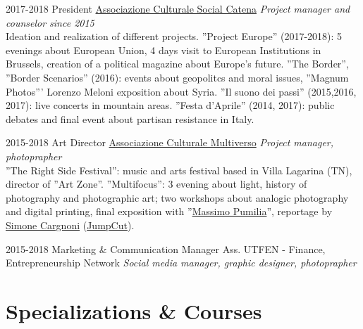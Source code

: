 \documentclass[]{friggeri-cv}
\begin{document}
\begin{entrylist}

\entry
    {2017-2018}
    {President}
    {\href{https://www.facebook.com/SocialCatena/}{Associazione Culturale Social Catena}}
    {\emph{Project manager and counselor since 2015}\\
    Ideation and realization of different projects. ''Project Europe'' (2017-2018): 5 evenings about European Union, 4 days visit to European Institutions in Brussels, creation of a political magazine about Europe's future. ''The Border'', ''Border Scenarios'' (2016): events about geopolitcs and moral issues, ''Magnum Photos''' Lorenzo Meloni exposition about Syria. ''Il suono dei passi'' (2015,2016, 2017): live concerts in mountain areas. ''Festa d’Aprile'' (2014, 2017): public debates and final event about partisan resistance in Italy.
    }

\entry
    {2015-2018}
    {Art Director}
    {\href{https://www.facebook.com/Asso.Multiverso/}{Associazione Culturale Multiverso}}
    {\emph{Project manager, photoprapher}\\
    ''The Right Side Festival'': music and arts festival based in Villa Lagarina (TN), director of ''Art Zone''. ''Multifocus'': 3 evening about light, history of photography and photographic art; two workshops about analogic photography and digital printing, final exposition with ''\href{http://simonecargnoni.com/massimopumilia/}{Massimo Pumilia}'', reportage by \href{http://simonecargnoni.com}{Simone Cargnoni} (\href{http://www.jumpcut.it}{JumpCut}).
    }

\entry
    {2015-2018}
    {Marketing \& Communication Manager}
    {Ass. UTFEN - Finance, Entrepreneurship Network}
    {\emph{Social media manager, graphic designer, photoprapher}}

\end{entrylist}


\section{Specializations \& Courses}
\end{document}
